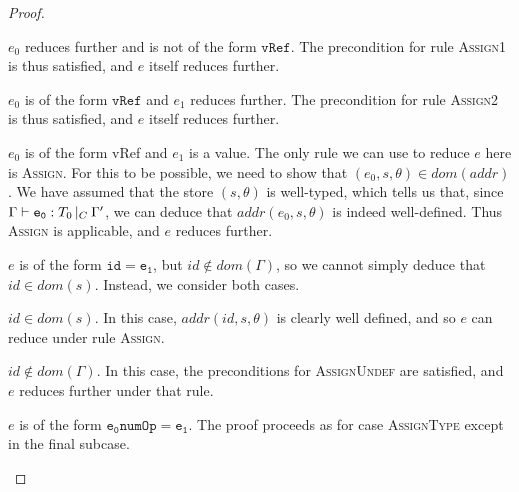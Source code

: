 \documentclass[a4paper]{article}
\theoremstyle{definition}
\theoremstyle{dotless}
\begin{document}
\begin{proof}
\begin{case}[AssignType]
	\begin{subcase}
	  $e_0$ reduces further and is not of the form $\mathtt{vRef}$. 
	  The precondition for rule \textsc{Assign1} is thus satisfied, and $e$
	  itself reduces further.
	\end{subcase}

	\begin{subcase}
	  $e_0$ is of the form $\mathtt{vRef}$ and $e_1$ reduces further. 
	  The precondition for rule \textsc{Assign2} is thus satisfied, and $e$
	  itself reduces further.
	\end{subcase}

	\begin{subcase}
	  $e_0$ is of the form vRef and $e_1$ is a value.
	  The only rule we can use to reduce $e$ here is \textsc{Assign}. For this
	  to be possible, we need to show that $(e_0, s, \theta) \in dom(addr)$.
	  We have assumed that the store $(s,\theta)$ is well-typed, which tells us
	  that, since $\Gamma{}\vdash\mathtt{e_0}: T_0\,|_C\:\Gamma'$, we can deduce that $addr(e_0,s,\theta)$
	  is indeed well-defined. Thus \textsc{Assign} is applicable, and $e$
	  reduces further.  
	\end{subcase}

  \end{case}

  \begin{case}[AssignTypeUndef]\label{assigntypeundef}

	$e$ is of the form $\mathtt{id = e_1}$, but $id \not\in dom(\Gamma)$, so we
	cannot simply deduce that $id \in dom(s)$. Instead, we consider both cases.

	\begin{subcase}
	  $id \in dom(s)$.
	  In this case, $addr(id, s, \theta)$ is clearly well defined, and so $e$
	  can reduce under rule \textsc{Assign}.
	\end{subcase}

  	\begin{subcase}
	  $id \not\in dom(\Gamma)$. 
	  In this case, the preconditions for \textsc{AssignUndef} are satisfied,
	  and $e$ reduces further under that rule.
	\end{subcase}

  \end{case}

  \begin{case}[NumAssignType]\label{numassigntype}

  	$e$ is of the form $\mathtt{e_0 numOp= e_1}$. The proof proceeds as for case
  	\textsc{AssignType} except in the final subcase. 


\end{case}
\end{proof}
\end{document}
